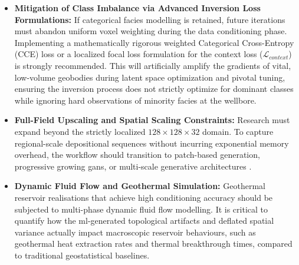 \begin{itemize}
    \item \textbf{Mitigation of Class Imbalance via Advanced Inversion Loss Formulations:} If categorical facies modelling is retained, future iterations must abandon uniform voxel weighting during the data conditioning phase. Implementing a mathematically rigorous weighted Categorical Cross-Entropy (CCE) loss or a localized focal loss formulation for the context loss ($\mathcal{L}_{context}$) is strongly recommended. This will artificially amplify the gradients of vital, low-volume geobodies during latent space optimization and pivotal tuning, ensuring the inversion process does not strictly optimize for dominant classes while ignoring hard observations of minority facies at the wellbore.
    
    \item \textbf{Full-Field Upscaling and Spatial Scaling Constraints:} Research must expand beyond the strictly localized $128 \times 128 \times 32$ domain. To capture regional-scale depositional sequences without incurring exponential memory overhead, the workflow should transition to patch-based generation, progressive growing \glspl{gan}, or multi-scale generative architectures \parencite{federico2025three, song2023gansim}.
    
    \item \textbf{Dynamic Fluid Flow and Geothermal Simulation:} Geothermal reservoir realisations that achieve high conditioning accuracy should be subjected to multi-phase dynamic fluid flow modelling. It is critical to quantify how the \gls{ml}-generated topological artifacts and deflated spatial variance actually impact macroscopic reservoir behaviours, such as geothermal heat extraction rates and thermal breakthrough times, compared to traditional geostatistical baselines.
\end{itemize}